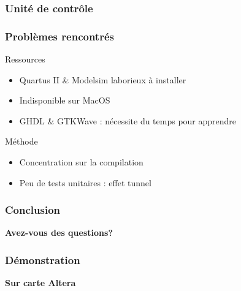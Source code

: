 \documentclass{beamer}
\begin{document}
\begin{frame}
\frametitle{Unité de contrôle}
\end{frame}

\begin{frame}
\frametitle{Problèmes rencontrés}
\begin{block}{Ressources}
	\begin{itemize}
		\item Quartus II & Modelsim laborieux à installer
		\item Indisponible sur MacOS
		\item GHDL & GTKWave : nécessite du temps pour apprendre
	\end{itemize}
\end{block}
\begin{block}{Méthode}
	\begin{itemize}
		\item Concentration sur la compilation
		\item Peu de tests unitaires : effet tunnel
	\end{itemize}
\end{block}
\end{frame}

\begin{frame}
\frametitle{Conclusion}
\end{frame}

\begin{frame}
\begin{center}
	{\Large \textbf{Avez-vous des questions?}}
\end{center}
\end{frame}

\begin{frame}
\frametitle{Démonstration}
\begin{center}
	{\Large \textbf{Sur carte Altera}}
\end{center}
\end{frame}

\end{document}
